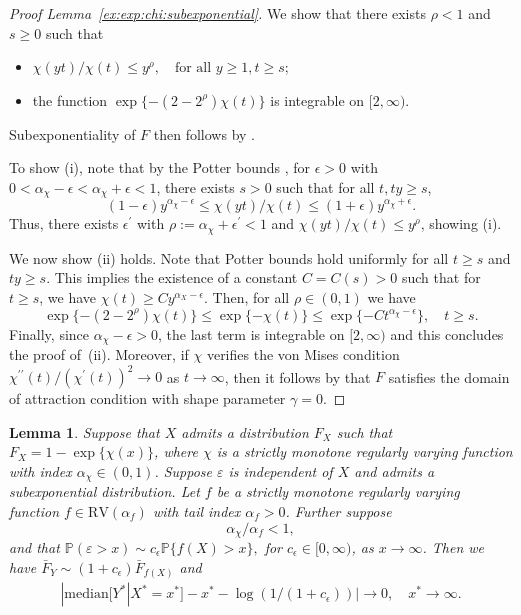 \documentclass{statsoc}
\newtheorem{lemma}{Lemma}
\theoremstyle{break}
\renewcommand{\P}{\mathbb P}
\def\M{\text{median}}
\begin{document}
\begin{proof}[Proof  Lemma~\ref{ex:exp:chi:subexponential}]
	
	We show that there exists $\rho < 1$ and $s \geq 0$ such that 
	 \begin{itemize}
		\item[(i)] $\chi(yt)/\chi(t) \leq y^\rho, \quad \text{for all } y \geq 1, t \geq s$;
		\item[(ii)] the function $\exp\{-(2-2^\rho) \chi(t)\}$ is integrable on $[2,\infty)$.
	 \end{itemize}
	Subexponentiality of $F$ then follows by \citet[][Theorem 3]{cline:1986}. 
	
	To show (i), note that by the Potter bounds \citep[][Proposition B.1.9]{dehaan:ferreira:2006}, for $\epsilon > 0$ with $0 <\alpha_\chi  - \epsilon  <\alpha_\chi + \epsilon < 1$, there exists $s > 0$ such that for all $t, ty \geq s$,
	\[
		 (1-\epsilon) y^{\alpha_\chi - \epsilon} \leq {\chi(yt)}/{\chi(t)} \leq (1+\epsilon) y^{\alpha_\chi + \epsilon}.
	\]
	Thus, there exists $\epsilon^\prime$ with $\rho := \alpha_\chi + \epsilon^\prime < 1$ and  ${\chi(yt)}/{\chi(t)} \leq y^{\rho}$, showing (i).
	
	
	We now show (ii) holds. Note that Potter bounds hold uniformly for all $t \geq s$ and $ty \geq s$. This implies the existence of a constant $C = C(s) > 0$ such that for $t \geq s$, we have $\chi(t) \geq C y^{\alpha_X - \epsilon}$. Then, for all $\rho \in (0,1)$ we have 
	\[
		\exp\{-(2-2^\rho)\chi(t)\} \leq \exp\{-\chi(t)\} \leq \exp\{- C t^{\alpha_\chi - \epsilon}\}, \quad t \geq s.
	\]
	Finally, since $\alpha_\chi -\epsilon > 0$, the last term is integrable on $[2,\infty)$ and this concludes the proof of~(ii).
	Moreover, if $\chi$ verifies the von Mises condition ${\chi^{\prime \prime} (t) }/{({\chi^\prime}(t))^2} \to 0$ as $t \to \infty$, then it follows by \citet[][Example 3.3.24]{embrechts:kluppelberg:mikosch:2013}
	that $F$ satisfies the domain of attraction condition with shape parameter $\gamma = 0$.
	
\end{proof}


\begin{lemma}\label{lem:model2:subexpo}
	Suppose that $X$ admits a distribution $F_X$ such that $F_X = 1-\exp\{ \chi(x)\}$, where $\chi$ is a strictly monotone regularly varying function with index $\alpha_\chi \in(0,1)$.
	Suppose $\varepsilon$ is independent of $X$ and admits a subexponential distribution.
	Let $f$ be a strictly monotone regularly varying function $f \in\text{RV}(\alpha_f)$ with tail index $\alpha_f  > 0$.
	Further suppose 
	\[\alpha_\chi / \alpha_f < 1,\]
	and that  $\P(\varepsilon > x) \sim c_\epsilon \P\{f(X)>x\},$ for $c_\epsilon \in [0,\infty)$, as $x\to\infty$.
	Then we have $\bar F_Y \sim (1+c_\epsilon) \bar F_{f(X)}$ and 
	\begin{align*}
		|\M[Y^* | X^* = x^*] - x^* - \log(1/(1+c_\epsilon))| \to 0, \quad x^* \to\infty.
	\end{align*} 
\end{lemma}
\end{document}

